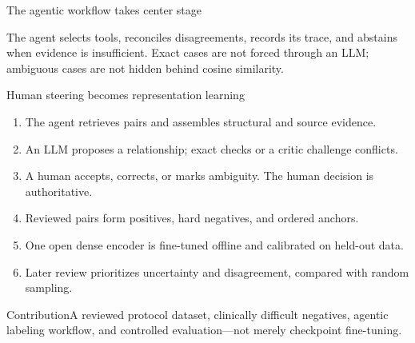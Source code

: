 \documentclass[aspectratio=169,10pt]{beamer}
\begin{document}
\begin{frame}{The agentic workflow takes center stage}
\begin{center}\end{center}
The agent selects tools, reconciles disagreements, records its trace, and abstains when evidence is insufficient. Exact cases are not forced through an LLM; ambiguous cases are not hidden behind cosine similarity.
\end{frame}

\begin{frame}{Human steering becomes representation learning}
\begin{enumerate}\item The agent retrieves pairs and assembles structural and source evidence.\item An LLM proposes a relationship; exact checks or a critic challenge conflicts.\item A human accepts, corrects, or marks ambiguity. The human decision is authoritative.\item Reviewed pairs form positives, hard negatives, and ordered anchors.\item One open dense encoder is fine-tuned offline and calibrated on held-out data.\item Later review prioritizes uncertainty and disagreement, compared with random sampling.\end{enumerate}
\begin{block}{Contribution}A reviewed protocol dataset, clinically difficult negatives, agentic labeling workflow, and controlled evaluation---not merely checkpoint fine-tuning.\end{block}
\end{frame}
\end{document}
